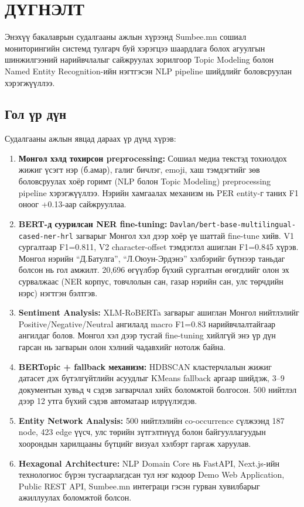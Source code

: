 \chapter*{ДҮГНЭЛТ}

Энэхүү бакалаврын судалгааны ажлын хүрээнд Sumbee.mn сошиал мониторингийн системд тулгарч буй хэрэгцээ шаардлага болох агуулгын шинжилгээний нарийвчлалыг сайжруулах зорилгоор Topic Modeling болон Named Entity Recognition-ийн нэгтгэсэн NLP pipeline шийдлийг боловсруулан хэрэгжүүллээ.

\section*{Гол үр дүн}

Судалгааны ажлын явцад дараах үр дүнд хүрэв:

\begin{enumerate}
    \item \textbf{Монгол хэлд тохирсон preprocessing:} Сошиал медиа текстэд тохиолдох жижиг үсэгт нэр (б.амар), галиг бичлэг, emoji, хаш тэмдэгтийг зөв боловсруулах хоёр горимт (NLP болон Topic Modeling) preprocessing pipeline хэрэгжүүллээ. Нэрийн хамгаалах механизм нь PER entity-г таних F1 оноог +0.13-аар сайжрууллаа.

    \item \textbf{BERT-д суурилсан NER fine-tuning:} \texttt{Davlan/bert-base-multilingual-cased-ner-hrl} загварыг Монгол хэл дээр хоёр үе шаттай fine-tune хийв. V1 сургалтаар F1=0.811, V2 character-offset тэмдэглэл ашиглан F1=0.845 хүрэв. Монгол нэрийн ``Д.Батулга'', ``Л.Оюун-Эрдэнэ'' хэлбэрийг бүтнээр таньдаг болсон нь гол амжилт. 20,696 өгүүлбэр бүхий сургалтын өгөгдлийг олон эх сурвалжаас (NER корпус, товчлолын сан, газар нэрийн сан, улс төрчдийн нэрс) нэгтгэн бэлтгэв.

    \item \textbf{Sentiment Analysis:} XLM-RoBERTa загварыг ашиглан Монгол нийтлэлийг Positive/Negative/Neutral ангилалд macro F1=0.83 нарийвчлалтайгаар ангилдаг болов. Монгол хэл дээр тусгай fine-tuning хийлгүй энэ үр дүн гарсан нь загварын олон хэлний чадавхийг нотолж байна.

    \item \textbf{BERTopic + fallback механизм:} HDBSCAN кластерчлалын жижиг датасет дэх бүтэлгүйтлийн асуудлыг KMeans fallback аргаар шийдэж, 3--9 документын хувьд ч сэдэв загварчлал хийх боломжтой болгосон. 500 нийтлэл дээр 12 утга бүхий сэдэв автоматаар илрүүлэгдэв.

    \item \textbf{Entity Network Analysis:} 500 нийтлэлийн co-occurrence сүлжээнд 187 node, 423 edge үүсч, улс төрийн зүтгэлтнүүд болон байгууллагуудын хоорондын харилцааны бүтцийг визуал хэлбэрт гаргаж харуулав.

    \item \textbf{Hexagonal Architecture:} NLP Domain Core нь FastAPI, Next.js-ийн технологиос бүрэн тусгаарлагдсан тул нэг кодоор Demo Web Application, Public REST API, Sumbee.mn интеграци гэсэн гурван хувилбарыг ажиллуулах боломжтой болсон.
\end{enumerate}

